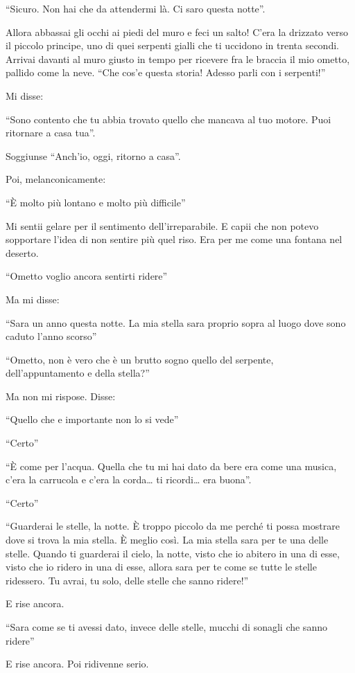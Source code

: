 \documentclass[11pt]{scrbook}
\begin{document}
``Sicuro. Non hai che da attendermi là. Ci saro questa notte''.

Allora abbassai gli occhi ai piedi del muro e feci un salto! C'era la
drizzato verso il piccolo principe, uno di quei serpenti gialli che ti
uccidono in trenta secondi. Arrivai davanti al muro giusto in tempo per
ricevere fra le braccia il mio ometto, pallido come la neve. ``Che cos'e
questa storia! Adesso parli con i serpenti!''

Mi disse:

``Sono contento che tu abbia trovato quello che mancava al tuo motore.
Puoi ritornare a casa tua''.

Soggiunse ``Anch'io, oggi, ritorno a casa''.

Poi, melanconicamente:

``È molto più lontano e molto più difficile''

Mi sentii gelare per il sentimento dell'irreparabile. E capii che non
potevo sopportare l'idea di non sentire più quel riso. Era per me come
una fontana nel deserto.

``Ometto voglio ancora sentirti ridere''

Ma mi disse:

``Sara un anno questa notte. La mia stella sara proprio sopra al luogo
dove sono caduto l'anno scorso''

``Ometto, non è vero che è un brutto sogno quello del serpente,
dell'appuntamento e della stella?''

Ma non mi rispose. Disse:

``Quello che e importante non lo si vede''

``Certo''

``È come per l'acqua. Quella che tu mi hai dato da bere era come una
musica, c'era la carrucola e c'era la corda\ldots{} ti ricordi\ldots{}
era buona''.

``Certo''

``Guarderai le stelle, la notte. È troppo piccolo da me perché ti possa
mostrare dove si trova la mia stella. È meglio così. La mia stella sara
per te una delle stelle. Quando ti guarderai il cielo, la notte, visto
che io abitero in una di esse, visto che io ridero in una di esse,
allora sara per te come se tutte le stelle ridessero. Tu avrai, tu solo,
delle stelle che sanno ridere!''

E rise ancora.

``Sara come se ti avessi dato, invece delle stelle, mucchi di sonagli
che sanno ridere''

E rise ancora. Poi ridivenne serio.
\end{document}
